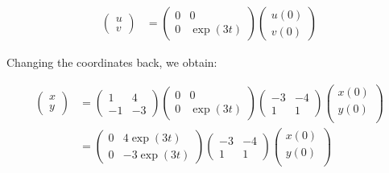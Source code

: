 \documentclass[12pt,letterpaper]{article}
\begin{document}
\begin{enumerate}[label=(\alph*)]
	      \begin{align}
		      \begin{pmatrix}
			      u \\
			      v
		      \end{pmatrix} & =
		      \begin{pmatrix}
			      0 & 0        \\
			      0 & \exp(3t)
		      \end{pmatrix} \begin{pmatrix}
			      u(0) \\
			      v(0)
		      \end{pmatrix}
	      \end{align}

	      Changing the coordinates back, we obtain:

	      \begin{align}
		      \begin{pmatrix}
			      x \\
			      y
		      \end{pmatrix} & =
		      \begin{pmatrix}
			      1  & 4  \\
			      -1 & -3
		      \end{pmatrix}\begin{pmatrix}
			      0 & 0        \\
			      0 & \exp(3t)
		      \end{pmatrix}
		      \begin{pmatrix}
			      -3 & -4 \\
			      1  & 1
		      \end{pmatrix}
		      \begin{pmatrix}
			      x(0) \\
			      y(0) \\
		      \end{pmatrix}\\
		                                 & =
		      \begin{pmatrix}
			      0 & 4 \exp(3t) \\
			      0 & -3\exp(3t)
		      \end{pmatrix}
		      \begin{pmatrix}
			      -3 & -4 \\
			      1  & 1
		      \end{pmatrix}
		      \begin{pmatrix}
			      x(0) \\
			      y(0) \\

\end{pmatrix}
\end{align}
\end{enumerate}
\end{document}
